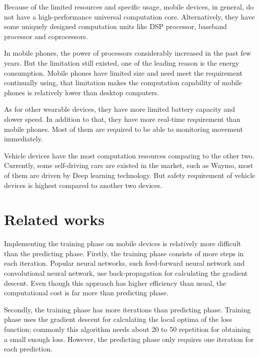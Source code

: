 \documentclass[article]{aaltoseries}
\begin{document}
Because of the limited resources and specific usage, mobile devices, in general, do not have a high-performance 
universal computation core. Alternatively, they have some uniquely designed computation units like DSP processor,
baseband processor and coprocessors.

In mobile phones, the power of processors considerably increased in the past few years. But the limitation still existed, 
one of the leading reason is the energy consumption. Mobile phones have limited size and need meet the requirement continually
using, that limitation makes the computation capability of mobile phones is relatively lower than desktop computers.

As for other wearable devices, they have more limited battery capacity and slower speed. In addition to that, 
they have more real-time requirement than mobile phones. Most of them are required to be able to monitoring
movement immediately.

Vehicle devices have the most computation resources comparing to the other two. Currently, some self-driving
cars are existed in the market, such as Waymo, most of them are driven by Deep learning technology. 
But safety requirement of vehicle devices is highest compared to another two devices.  








\section{Related works}
\label{sec:related_works}

Implementing the training phase on mobile devices is relatively more difficult than the predicting phase.
Firstly, the training phase consists of more steps in each iteration. Popular neural networks, such
feed-forward neural network and convolutional neural network, use back-propagation\cite{le1988theoretical}
for calculating the gradient descent. Even though this approach has higher efficiency than usual,
the computational cost is far more than predicting phase.

Secondly, the training phase has more iterations than predicting phase. Training phase uses the gradient descent
for calculating the local optima of the loss function; commonly this algorithm needs about 20 to 50 repetition
for obtaining a small enough loss. However, the predicting phase only requires one iteration for each prediction.
\end{document}
